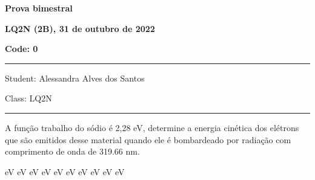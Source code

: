 \documentclass[12pt, addpoints]{exam}
\begin{document}
        \begin{minipage}[b]{0.75\linewidth}
            \begin{flushleft}
                {\bf \large Prova bimestral}
            \end{flushleft}
            \begin{flushleft}
                {\bf \large LQ2N (2B), 31 de outubro de 2022}
            \end{flushleft}
        \end{minipage}
        \begin{minipage}[b]{0.20\linewidth}
            \begin{flushright}
                {\bf \large Code: 0}
            \end{flushright}
        \end{minipage}
        \vspace{0.5cm} \hrule \vspace{0.5cm}
        \begin{minipage}{0.75\linewidth}
            \begin{flushleft}
                Student: Alessandra Alves dos Santos
            \end{flushleft}
        \end{minipage}
        \begin{minipage}{0.20\linewidth}
            \begin{flushright}
                Class: LQ2N
            \end{flushright}
        \end{minipage}
        \vspace{0.5cm} \hrule \vspace{0.5cm}
        \begin{questions}
\begin{multicols*}{2}
\question A função trabalho do sódio é 2,28 eV, determine a energia cinética dos elétrons que são emitidos desse material quando ele é bombardeado por radiação com comprimento de onda de  319.66 nm.

\begin{oneparchoices}
 eV eV eV eV eV eV eV eV eV eV
\end{oneparchoices}\end{multicols*}
\end{questions}
\newpage
\end{document}
